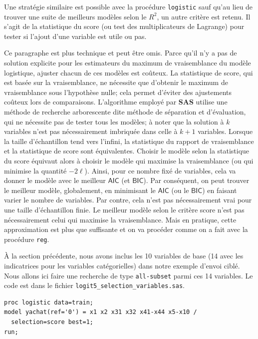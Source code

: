\documentclass[
  11pt,
  letterpaper,
]{book}
\theoremstyle{definition}
\theoremstyle{definition}
\theoremstyle{definition}
\theoremstyle{remark}
\begin{document}
Une stratégie similaire est possible avec la procédure \texttt{logistic} sauf qu'au lieu de trouver une suite de meilleurs modèles selon le \(R^2\), un autre critère est retenu. Il s'agit de la statistique du score (ou test des multiplicateurs de Lagrange) pour tester si l'ajout d'une variable est utile ou pas.

Ce paragraphe est plus technique et peut être omis. Parce qu'il n'y a pas de solution explicite pour les estimateurs du maximum de vraisemblance du modèle logistique, ajuster chacun de ces modèles est coûteux. La statistique de score, qui est basée sur la vraisemblance, ne nécessite que d'obtenir le maximum de vraisemblance sous l'hypothèse nulle; cela permet d'éviter des ajustements coûteux lors de comparaisons. L'algorithme employé par \textbf{SAS} utilise une méthode de recherche arborescente dite méthode de séparation et d'évaluation, qui ne nécessite pas de tester tous les modèles; à noter que la solution à \(k\) variables n'est pas nécessairement imbriquée dans celle à \(k+1\) variables. Lorsque la taille d'échantillon tend vers l'infini, la statistique du rapport de vraisemblance et la statistique de score sont équivalentes. Choisir le modèle selon la statistique du score équivaut alors à choisir le modèle qui maximise la vraisemblance (ou qui minimise la quantité \(-2 \ell\)). Ainsi, pour ce nombre fixé de variables, cela va donner le modèle avec le meilleur \(\mathsf{AIC}\) (et \(\mathsf{BIC}\)). Par conséquent, on peut trouver le meilleur modèle, globalement, en minimisant le \(\mathsf{AIC}\) (ou le \(\mathsf{BIC}\)) en faisant varier le nombre de variables. Par contre, cela n'est pas nécessairement vrai pour une taille d'échantillon finie. Le meilleur modèle selon le critère score n'est pas nécessairement celui qui maximise la vraisemblance. Mais en pratique, cette approximation est plus que suffisante et on va procéder comme on a fait avec la procédure \texttt{reg}.

À la section précédente, nous avons inclus les 10 variables de base (14 avec les indicatrices pour les variables catégorielles) dans notre exemple d'envoi ciblé. Nous allons ici faire une recherche de type \texttt{all-subset} parmi ces 14 variables. Le code est dans le fichier \texttt{logit5\_selection\_variables.sas}.

\begin{verbatim}
proc logistic data=train;
model yachat(ref='0') = x1 x2 x31 x32 x41-x44 x5-x10 / 
  selection=score best=1;
run;
\end{verbatim}
\end{document}
